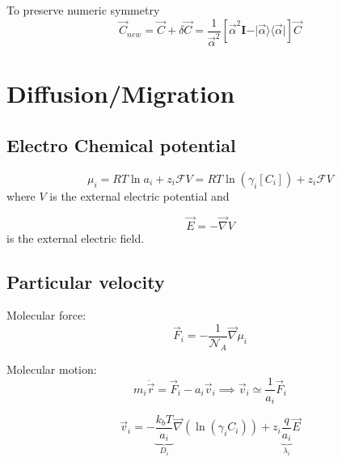 \documentclass[aps,12pt]{revtex4}
\begin{document}
To preserve numeric symmetry
\begin{equation}
	\vec C_{new} = \vec C + \delta \vec C = \dfrac{1}{\vec \alpha^2}\left[\vec \alpha^2 \bm{I} - \vert \vec \alpha \rangle \langle \vec \alpha \vert \right] \vec C
\end{equation}

 	

\section{Diffusion/Migration}

\subsection{Electro Chemical potential}

\begin{equation}
	\mu_i = RT \ln a_i + z_i \mathcal{F} V = RT \ln (\gamma_i[C_i]) + z_i \mathcal{F} V
\end{equation}
where $V$ is the external electric potential and

\begin{equation}
	\vec{E} = -\vec{\nabla} V
\end{equation}
is the external electric field.

\subsection{Particular velocity}
Molecular force:	
\begin{equation}
	\vec{F}_i = - \frac{1}{\mathcal{N}_A} \vec{\nabla} \mu_i
\end{equation}

Molecular motion:
\begin{equation}
	m_i \ddot {\vec{r}} = \vec{F}_i - a_i \vec{v}_i \implies \vec{v}_i \simeq \dfrac{1}{a_i} \vec{F}_i
\end{equation}

\begin{equation}
	\vec{v}_i = -\underbrace{\dfrac{k_bT}{a_i}}_{D_i} \vec{\nabla}(\ln(\gamma_i C_i))  + z_i \underbrace{\dfrac{ q}{a_i}}_{\lambda_i} \vec{E}
\end{equation}
\end{document}
